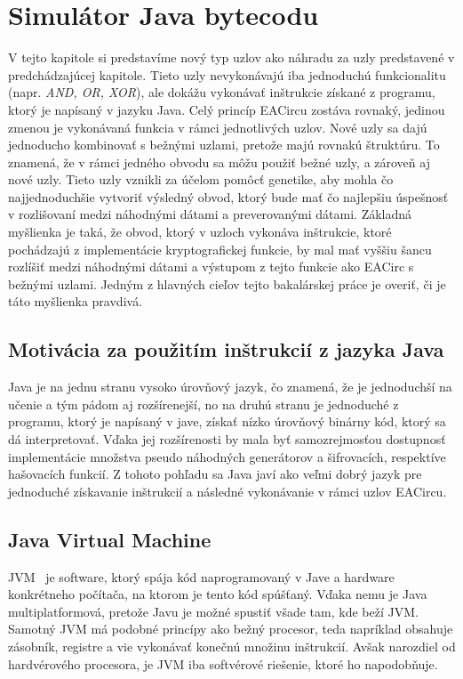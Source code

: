 \chapter{Simulátor Java bytecodu}
\label{chap:eacirc-jvmsim}

V tejto kapitole si predstavíme nový typ uzlov ako náhradu za uzly predstavené v predchádzajúcej kapitole. Tieto uzly nevykonávajú iba jednoduchú funkcionalitu (napr. \textit{AND, OR, XOR}), ale dokážu vykonávať inštrukcie získané z programu, ktorý je napísaný v jazyku Java. Celý princíp EACircu zostáva rovnaký, jedinou zmenou je vykonávaná funkcia v rámci jednotlivých uzlov. Nové uzly sa dajú jednoducho kombinovať s bežnými uzlami, pretože majú rovnakú štruktúru. To znamená, že v rámci jedného obvodu sa môžu použiť bežné uzly, a zároveň aj nové uzly. Tieto uzly vznikli za účelom pomôcť genetike, aby mohla čo najjednoduchšie vytvoriť výsledný obvod, ktorý bude mať čo najlepšiu úspešnosť v rozlišovaní medzi náhodnými dátami a preverovanými dátami. Základná myšlienka je taká, že obvod, ktorý v uzloch vykonáva inštrukcie, ktoré pochádzajú z implementácie kryptografickej funkcie, by mal mať vyššiu šancu rozlíšiť medzi náhodnými dátami a výstupom z tejto funkcie ako EACirc s bežnými uzlami. Jedným z hlavných cieľov tejto bakalárskej práce je overiť, či je táto myšlienka pravdivá.

\section{Motivácia za použitím inštrukcií z jazyka Java}
\label{sec:java-bytecode}

Java je na jednu stranu vysoko úrovňový jazyk, čo znamená, že je jednoduchší na učenie a tým pádom aj rozšírenejší, no na druhú stranu je jednoduché z programu, ktorý je napísaný v jave, získať nízko úrovňový binárny kód, ktorý sa dá interpretovať. Vďaka jej rozšírenosti by mala byť samozrejmosťou dostupnosť implementácie množstva pseudo náhodných generátorov a šifrovacích, respektíve hašovacích funkcií. Z tohoto pohľadu sa Java javí ako veľmi dobrý jazyk pre jednoduché získavanie inštrukcií a následné vykonávanie v rámci uzlov EACircu.

\section{Java Virtual Machine}
\label{sec:jvm}

JVM~\parencite{JVM} je software, ktorý spája kód naprogramovaný v Jave a hardware konkrétneho počítača, na ktorom je tento kód spúšťaný. Vďaka nemu je Java multiplatformová, pretože Javu je možné spustiť všade tam, kde beží JVM. Samotný JVM má podobné princípy ako bežný procesor, teda napríklad obsahuje zásobník, registre a vie vykonávať konečnú množinu inštrukcií. Avšak narozdiel od hardvérového procesora, je JVM iba softvérové riešenie, ktoré ho napodobňuje.

